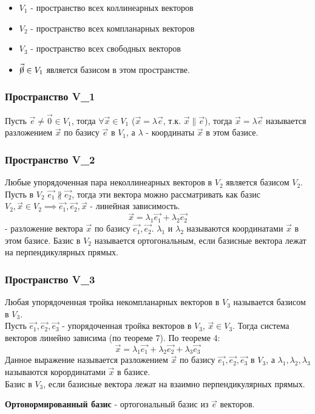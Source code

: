 \begin{itemize}
  \item $V_1$ - пространство всех коллинеарных векторов
  \item $V_2$ - пространство всех компланарных векторов
  \item $V_3$ - пространство всех свободных векторов
  \item $\vec{\cancel{0}} \in V_1$ является базисом в этом пространстве. \\
\end{itemize}

\subsubsection*{Пространство V_1}
Пусть $\vec{e} \neq \vec{0} \in V_1$, тогда $\forall \vec{x} \in V_1$ ($\vec{x} = \lambda \vec{e}$, т.к. $\vec{x} \parallel \vec{e}$), тогда $\vec{x} = \lambda \vec{e}$ называется разложением $\vec{x}$ по базису $\vec{e}$ в $V_1$, а  $\lambda$ - координаты $\vec{x}$ в этом базисе.

\subsubsection*{Пространство V_2}
Любые упорядоченная пара неколлинеарных векторов в $V_2$ является базисом $V_2$. \\
Пусть в $V_2$ $\vec{e_1} \not \parallel \vec{e_2}$, тогда эти вектора можно рассматривать как базис $V_2, \vec{x} \in V_2 \implies \vec{e_1}, \vec{e_2}, \vec{x}$ - линейная зависимость. 
\[
  \vec{x} = \lambda_1 \vec{e_1} + \lambda_2 \vec{e_2}
\]
- разложение вектора $\vec{x}$ по базису $\vec{e_1}, \vec{e_2}$. $\lambda_1$ и $\lambda_2$ называются координатами $\vec{x}$ в этом базисе.
Базис в $V_2$ называется ортогональным, если базисные вектора лежат на перпендикулярных прямых.

\subsubsection*{Пространство V_3}
Любая упорядоченная тройка некомпланарных векторов в $V_3$ называется базисом в $V_3$.\\
Пусть $\vec{e_1}, \vec{e_2}, \vec{e_3}$ - упорядоченная тройка векторов в $V_3$, $\vec{x} \in V_3$. Тогда система векторов линейно зависима (по теореме 7). По теореме 4:
\[
  \vec{x} = \lambda_1 \vec{e_1} + \lambda_2 \vec{e_2} + \lambda_3 \vec{e_3}
\] 
Данное выражение называется разложением $\vec{x}$ по базису $\vec{e_1}, \vec{e_2}, \vec{e_3}$ в $V_3$, а $\lambda_1, \lambda_2, \lambda_3$ называются корординатами $\vec{x}$ в базисе. \\
Базис в $V_3$, если базисные вектора лежат на взаимно перпендикулярных прямых.

\begin{definition}
  \textbf{Ортонормированный базис} - ортогональный базис из $\vec{e}$ векторов.
\end{definition}

